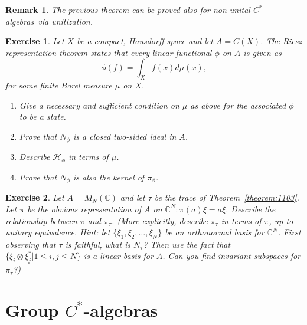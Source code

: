 \documentclass{book}
\newtheorem{exercise}{Exercise}[section]
\newtheorem{remark}[definition]{Remark}
\def\cstars{\(C^*\)-algebras}
\begin{document}
\begin{remark}
  The previous theorem can be proved also for non-unital \cstars\ via unitization.
\end{remark}
\begin{exercise}
  Let \(X\) be a compact, Hausdorff space and let \(A = C(X)\).
  The Riesz representation theorem states that every linear functional \(\phi\) on \(A\)
  is given as
  \[\phi(f) = \int_X f(x)d\mu(x),\]
  for some finite Borel measure \(\mu\) on \(X\).
  \begin{enumerate}
    \item Give a necessary and sufficient condition on \(\mu\) as above for the associated \(\phi\) to be a state.
    \item Prove that \(N_\phi\) is a closed two-sided ideal in \(A\).
    \item Describe \(\mathcal{H}_\phi\) in terms of \(\mu\).
    \item Prove that \(N_\phi\) is also the kernel of \(\pi_\phi\).
  \end{enumerate}
\end{exercise}
\begin{exercise}
  Let \(A = M_N(\mathbb{C})\) and let \(\tau\) be the trace of Theorem~\ref{theorem:1103}.
  Let \(\pi\) be the obvious representation of \(A\) on \(\mathbb{C}^N: \pi(a)\xi = a\xi\). Describe the
  relationship between \(\pi\) and \(\pi_\tau\). (More explicitly, describe \(\pi_\tau\) in terms of \(\pi\),
  up to unitary equivalence. Hint: let \(\{\xi_1,\xi_2,\ldots,\xi_N\}\) be an orthonormal basis
  for \(\mathbb{C}^N\). First observing that \(\tau\) is faithful, what is \(N_\tau\)? Then use the fact
  that \(\{\xi_i \otimes \xi^*_j | 1 \leq i,j \leq N\}\) is a linear basis for \(A\). Can you find invariant
  subspaces for \(\pi_\tau\)?)
\end{exercise}

\chapter{Group \texorpdfstring{\(C^*\)-algebras}{C*algebras}}
\end{document}
